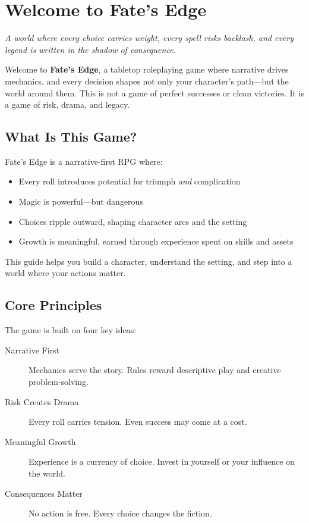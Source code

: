 \chapter{Welcome to Fate's Edge} \label{ch:intro}

\emph{A world where every choice carries weight, every spell risks backlash, and every legend is written in the shadow of consequence.}

Welcome to \textbf{Fate's Edge}, a tabletop roleplaying game where narrative drives mechanics, and every decision shapes not only your character's path—but the world around them. This is not a game of perfect successes or clean victories. It is a game of risk, drama, and legacy.

\section*{What Is This Game?} 

Fate's Edge is a narrative-first RPG where: \begin{itemize} \item Every roll introduces potential for triumph \emph{and} complication \item Magic is powerful—but dangerous \item Choices ripple outward, shaping character arcs and the setting \item Growth is meaningful, earned through experience spent on skills and assets \end{itemize}

This guide helps you build a character, understand the setting, and step into a world where your actions matter.

\section*{Core Principles} 

The game is built on four key ideas:

\begin{description} \item[Narrative First] Mechanics serve the story. Rules reward descriptive play and creative problem-solving. \item[Risk Creates Drama] Every roll carries tension. Even success may come at a cost. \item[Meaningful Growth] Experience is a currency of choice. Invest in yourself or your influence on the world. \item[Consequences Matter] No action is free. Every choice changes the fiction. \end{description}

